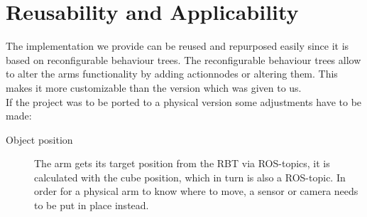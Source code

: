 \documentclass[report]{iisthesis}
\begin{document}
\chapter{Reusability and Applicability}
The implementation we provide can be reused and repurposed easily since it is based on reconfigurable behaviour trees. The reconfigurable behaviour trees allow to alter the arms functionality
by adding actionnodes or altering them. This makes it more customizable than the version which was given to us. \\
If the project was to be ported to a physical version some adjustments have to be made:
\begin{description}
    \item[Object position] The arm gets its target position from the RBT via ROS-topics, it is calculated with the cube position, which in turn is also a ROS-topic. In order for a physical arm to know where to move, a sensor or camera needs to be put in place instead. 
    \item[] 
\end{description} 



\end{document}

